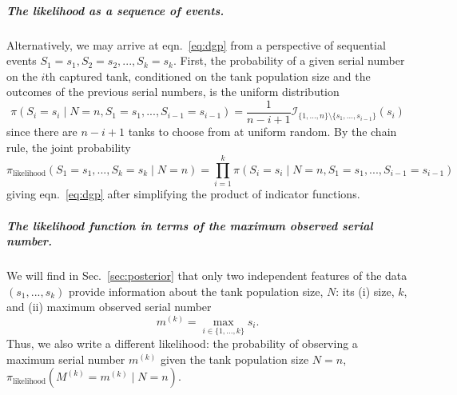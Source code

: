 \documentclass[11pt, oneside]{article}
\newcommand{\data}{$(s_1, ..., s_k)$\xspace}
\begin{document}
\subparagraph{The likelihood as a sequence of events.} 
Alternatively, we may arrive at eqn.~\ref{eq:dgp} from a perspective of sequential events $S_1=s_1, S_2=s_2, ..., S_k=s_k$. First, the probability of a given serial number on the $i$th captured tank, conditioned on the tank population size and the outcomes of the previous serial numbers, is the uniform distribution
\begin{equation}
	\pi (S_i=s_i \mid N=n, S_1=s_1, ..., S_{i-1}=s_{i-1})=\dfrac{1}{n-i+1} \mathcal{I}_{ \{1,...,n\} \setminus \{s_1, ..., s_{i-1}\}}(s_i)
\end{equation}
since there are $n-i+1$ tanks to choose from at uniform random.
By the chain rule, the joint probability
\begin{equation}
	\pi_{\text{likelihood}}(S_1=s_1, ..., S_k=s_k \mid N=n) = \displaystyle \prod_{i=1}^k \pi (S_i=s_i \mid N=n, S_1=s_1,...,S_{i-1}=s_{i-1})
\end{equation}
giving eqn.~\ref{eq:dgp} after simplifying the product of indicator functions.

\subparagraph{The likelihood function in terms of the maximum observed serial number.}
We will find in Sec.~\ref{sec:posterior} that only two independent features of the data \data provide information about the tank population size, $N$: its (i) size, $k$, and (ii) maximum observed serial number 
\begin{equation}
    m^{(k)} = \max_{i \in \{1, ..., k\}} s_i .
\end{equation} 
Thus, we also write a different likelihood: the probability of observing a maximum serial number $m^{(k)}$ given the tank population size $N=n$,  $\pi_{\text{likelihood}}(M^{(k)}=m^{(k)} \mid N=n)$.
\end{document}
